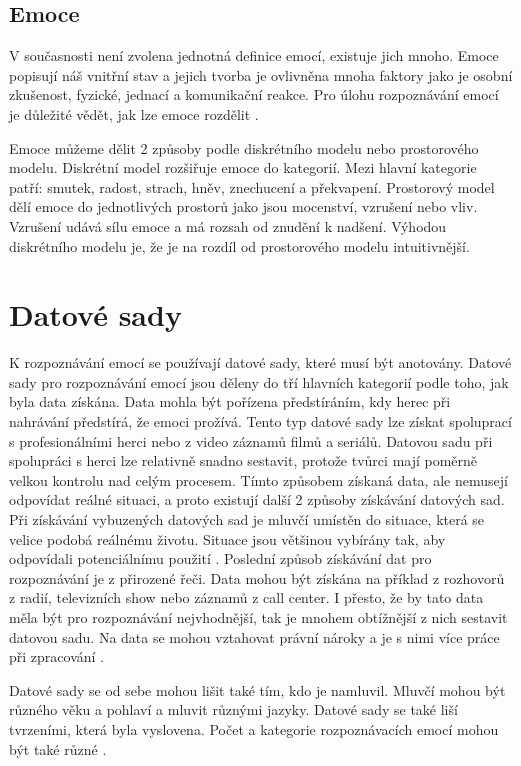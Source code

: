 \documentclass[FM,BP]{tulthesis}
\begin{document}
\section{Emoce}
V současnosti není zvolena jednotná definice emocí, existuje jich mnoho. Emoce popisují náš vnitřní stav a jejich tvorba je ovlivněna mnoha faktory jako je osobní zkušenost, fyzické, jednací a komunikační reakce. Pro úlohu rozpoznávání emocí je důležité vědět, jak lze emoce rozdělit \cite{DBLP:journals/speech/AkcayO20}.

Emoce můžeme dělit 2 způsoby podle diskrétního modelu nebo prostorového modelu. Diskrétní model rozšiřuje emoce do kategorií. Mezi hlavní kategorie patří: smutek, radost, strach, hněv, znechucení a překvapení. Prostorový model dělí emoce do jednotlivých prostorů jako jsou mocenství, vzrušení nebo vliv. Vzrušení udává sílu emoce a má rozsah od znudění k nadšení. Výhodou diskrétního modelu je, že je na rozdíl od prostorového modelu intuitivnější. \cite{DBLP:journals/speech/AkcayO20}

\chapter{Datové sady}
K rozpoznávání emocí se používají datové sady, které musí být anotovány. Datové sady pro rozpoznávání emocí jsou děleny do tří hlavních kategorií podle toho, jak byla data získána. Data mohla být pořízena předstíráním, kdy herec při nahrávání předstírá, že emoci prožívá. Tento typ datové sady lze získat spoluprací s profesionálními herci nebo z video záznamů filmů a seriálů. Datovou sadu při spolupráci s herci lze relativně snadno sestavit, protože tvůrci mají poměrně velkou kontrolu nad celým procesem. Tímto způsobem získaná data, ale nemusejí odpovídat reálné situaci, a proto existují další 2 způsoby získávání datových sad. Při získávání vybuzených datových sad je mluvčí umístěn do situace, která se velice podobá reálnému životu. Situace jsou většinou vybírány tak, aby odpovídali potenciálnímu použití \cite{konar_chakraborty_2015}. Poslední způsob získávání dat pro rozpoznávání je z přirozené řeči. Data mohou být získána na příklad z rozhovorů z radií, televizních show nebo záznamů z call center. I přesto, že by tato data měla být pro rozpoznávání nejvhodnější, tak je mnohem obtížnější z nich sestavit datovou sadu. Na data se mohou vztahovat právní nároky a je s nimi více práce při zpracování \cite{DBLP:journals/speech/AkcayO20}.

Datové sady se od sebe mohou lišit také tím, kdo je namluvil. Mluvčí mohou být různého věku a pohlaví a mluvit různými jazyky. Datové sady se také liší tvrzeními, která byla vyslovena. Počet a kategorie rozpoznávacích emocí mohou být také různé \cite{DBLP:journals/speech/AkcayO20}.
\end{document}

